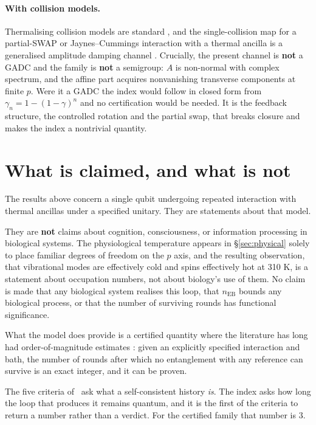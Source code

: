\documentclass[11pt,a4paper]{article}
\theoremstyle{definition}
\theoremstyle{remark}
\newcommand{\nEB}{n_{\mathrm{EB}}}
\begin{document}
\paragraph{With collision models.} Thermalising collision models are standard \cite{Ciccarello2022}, and the single-collision map for a partial-SWAP or Jaynes--Cummings interaction with a thermal ancilla is a generalised amplitude damping channel \cite{KSW2020}. Crucially, the present channel is \textbf{not} a GADC and the family is \textbf{not} a semigroup: $A$ is non-normal with complex spectrum, and the affine part acquires nonvanishing transverse components at finite $p$. Were it a GADC the index would follow in closed form from $\gamma_n = 1-(1-\gamma)^n$ and no certification would be needed. It is the feedback structure, the controlled rotation and the partial swap, that breaks closure and makes the index a nontrivial quantity.

\section{What is claimed, and what is not}\label{sec:claims}

The results above concern a single qubit undergoing repeated interaction with thermal ancillas under a specified unitary. They are statements about that model.

They are \textbf{not} claims about cognition, consciousness, or information processing in biological systems. The physiological temperature appears in \S\ref{sec:physical} solely to place familiar degrees of freedom on the $p$ axis, and the resulting observation, that vibrational modes are effectively cold and spins effectively hot at 310 K, is a statement about occupation numbers, not about biology's use of them. No claim is made that any biological system realises this loop, that $\nEB$ bounds any biological process, or that the number of surviving rounds has functional significance.

What the model does provide is a certified quantity where the literature has long had order-of-magnitude estimates \cite{Tegmark2000,Hagan2002}: given an explicitly specified interaction and bath, the number of rounds after which no entanglement with any reference can survive is an exact integer, and it can be proven.

The five criteria of~\cite{PaperI} ask what a self-consistent history
\emph{is}. The index asks how long the loop that produces it remains quantum,
and it is the first of the criteria to return a number rather than a verdict.
For the certified family that number is $3$.
\end{document}
